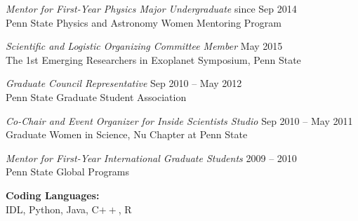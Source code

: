 \begin{small}
{\sl Mentor for First-Year Physics Major Undergraduate} \hfill since Sep 2014 \\
Penn State Physics and Astronomy Women Mentoring Program
\vspace{10pt}

{\sl Scientific and Logistic Organizing Committee Member} \hfill May
2015 \\
The 1st Emerging Researchers in Exoplanet Symposium, Penn State
\vspace{10pt}

{\sl Graduate Council Representative} \hfill        Sep 2010 -- May 2012  \\
Penn State Graduate Student Association 
\vspace{10pt}

 {\sl Co-Chair and Event Organizer for Inside Scientists Studio} \hfill        Sep 2010 -- May 2011  \\
Graduate Women in Science, Nu Chapter at Penn State 
\vspace{10pt}

{\sl Mentor for First-Year International Graduate Students} \hfill
2009 -- 2010 \\
Penn State Global Programs
\vspace{10pt}


 


{\bf Coding Languages:} \\
IDL, Python, Java, C$++$, R
\vspace{10pt}


\end{small}
